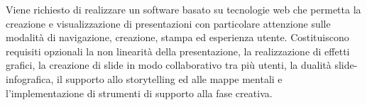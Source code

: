 Viene richiesto di realizzare un software basato su tecnologie web che permetta la creazione e visualizzazione di presentazioni con particolare attenzione sulle modalità di navigazione, creazione, stampa ed esperienza utente.
Costituiscono requisiti opzionali la non linearità della presentazione, la realizzazione di effetti grafici, la creazione di \gls{slide} in modo collaborativo tra più utenti, la dualità \gls{slide}-\gls{infografica}, il supporto allo storytelling ed alle mappe mentali e l'implementazione di strumenti di supporto  alla fase creativa.


